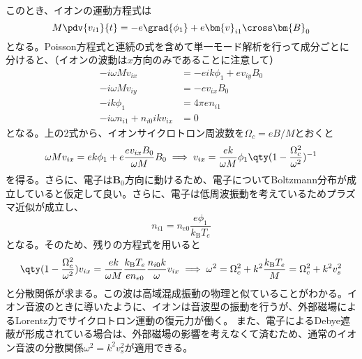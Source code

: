 このとき、イオンの運動方程式は
\begin{equation}
	M\pdv{v_{i1}}{t} = -e\grad{\phi_1} + e\bm{v}_{i1}\cross\bm{B}_0
\end{equation}
となる。Poisson方程式と連続の式を含めて単一モード解析を行って成分ごとに分けると、（イオンの波動は$x$方向のみであることに注意して）
\begin{align}
	-i\omega{}Mv_{ix}                & = -eik\phi_1 + ev_{iy}B_0 \\
	-i\omega{}Mv_{iy}                & = -ev_{ix}B_0             \\
	-ik\phi_1                        & = 4\pi{}en_{i1}           \\
	-i\omega{}n_{i1} +n_{i0}ikv_{ix} & = 0
\end{align}
となる。上の2式から、イオンサイクロトロン周波数を$\Omega_{c} = eB/M$とおくと
\begin{equation}
	\omega{}Mv_{ix} = ek\phi_1 + e\frac{ev_{ix}B_0}{\omega{}M}B_0 \implies v_{ix} = \frac{ek}{\omega{}M}\phi_1\qty(1-\frac{\Omega^2_c}{\omega^2})^{-1}
\end{equation}
を得る。さらに、電子は$\bm{B}_0$方向に動けるため、電子についてBoltzmann分布が成立していると仮定して良い。さらに、電子は低周波振動を考えているためプラズマ近似が成立し、
\begin{equation}
	n_{i1} = n_{e0}\frac{e\phi_1}{k_{\text{B}}T_e}
\end{equation}
となる。そのため、残りの方程式を用いると
\begin{equation}
	\qty(1-\frac{\Omega^2_c}{\omega^2})v_{ix} = \frac{ek}{\omega{}M}\frac{k_{\text{B}}T_e}{en_{e0}}\frac{n_{i0}k}{\omega}v_{ix}
	\implies \omega^2 = \Omega^2_c + k^2\frac{k_{\text{B}}T_e}{M} = \Omega^2_c + k^2v^2_s
\end{equation}
と分散関係が求まる。この波は高域混成振動の物理と似ていることがわかる。イオン音波のときに導いたように、イオンは音波型の振動を行うが、外部磁場によるLorentz力でサイクロトロン運動の復元力が働く。
また、電子によるDebye遮蔽が形成されている場合は、外部磁場の影響を考えなくて済むため、通常のイオン音波の分散関係$\omega^2 = k^2v^2_s$が適用できる。

